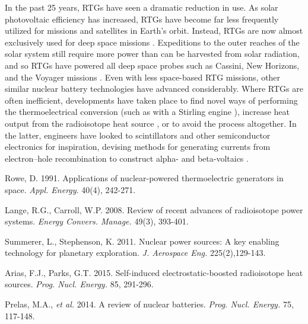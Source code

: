 \documentclass{article}
\newcommand{\tab}{\-\hspace{1cm}}
\begin{document}
\begin{multicols}{2}
\tab In the past 25 years, RTGs have seen a dramatic reduction in use. As solar photovoltaic efficiency has increased, RTGs have become far less frequently utilized for missions and satellites in Earth's orbit. Instead, RTGs are now almost exclusively used for deep space missions \cite{summerer}.  Expeditions to the outer reaches of the solar system still require more power than can be harvested from solar radiation, and so RTGs have powered all deep space probes such as Cassini, New Horizons, and the Voyager missions \cite{lange}. Even with less space-based RTG missions, other similar nuclear battery technologies have advanced considerably. Where RTGs are often inefficient, developments have taken place to find novel ways of performing the thermoelectrical conversion (such as with a Stirling engine \cite{lange}), increase heat output from the radioisotope heat source \cite{arias}, or to avoid the process altogether. In the latter, engineers have looked to scintillators and other semiconductor electronics for inspiration, devising methods for generating currents from electron--hole recombination to construct alpha- and beta-voltaics \cite{prelas}.



\begin{thebibliography}{99}
	Rowe, D.
	1991.
	Applications of nuclear-powered thermoelectric generators in space.
	\textit{Appl. Energy}.
	40(4), 242-271.
	
	Lange, R.G., Carroll, W.P. 
	2008.
	Review of recent advances of radioisotope power systems.
	\textit{Energy Convers. Manage.}
	49(3), 393-401.
	
	Summerer, L., Stephenson, K. 
	2011.
	Nuclear power sources: A key enabling technology for planetary exploration.
	\textit{J. Aerospace Eng.}
	225(2),129-143.
	
	Arias, F.J., Parks, G.T.
	2015. 
	Self-induced electrostatic-boosted radioisotope heat sources.
	\textit{Prog. Nucl. Energy.}
	85, 291-296.
	
	Prelas, M.A., \textit{et al.}
	2014. 
	A review of nuclear batteries. 
	\textit{Prog. Nucl. Energy.}
	 75, 117-148.
	
\end{thebibliography}

\end{multicols}
\end{document}
